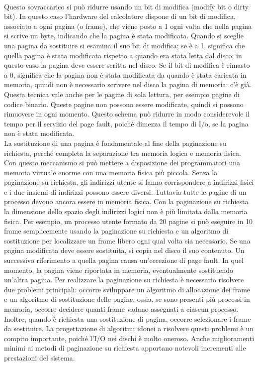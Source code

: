 \documentclass{article}
\begin{document}
				\\Questo sovraccarico si può ridurre usando un bit di modifica (modify bit o dirty bit). In questo caso l’hardware del calcolatore dispone di un bit di modifica, associato a ogni pagina (o frame), che viene posto a 1 ogni volta che nella pagina si scrive un byte, indicando che la pagina è stata modificata. Quando si sceglie una pagina da sostituire si esamina il suo bit di modifica; se è a 1, significa che quella pagina è stata modificata rispetto a quando era stata letta dal disco; in questo caso la pagina deve essere scritta nel disco. Se il bit di modifica è rimasto a 0, significa che la pagina non è stata modificata da quando è stata caricata in memoria, quindi non è necessario scrivere nel disco la pagina di memoria: c’è già. Questa tecnica vale anche per le pagine di sola lettura, per esempio pagine di codice binario. Queste pagine non possono essere modificate, quindi si possono rimuovere in ogni momento. Questo schema può ridurre in modo considerevole il tempo per il servizio del page fault, poiché dimezza il tempo di I/o, se la pagina non è stata modificata.
				\\La sostituzione di una pagina è fondamentale al fine della paginazione su richiesta, perché completa la separazione tra memoria logica e memoria fisica. Con questo meccanismo si può mettere a disposizione dei programmatori una memoria virtuale enorme con una memoria fisica più piccola. Senza la paginazione su richiesta, gli indirizzi utente si fanno corrispondere a indirizzi fisici e i due insiemi di indirizzi possono essere diversi. Tuttavia tutte le pagine di un processo devono ancora essere in memoria fisica. Con la paginazione su richiesta la dimensione dello spazio degli indirizzi logici non è più limitata dalla memoria fisica. Per esempio, un processo utente formato da 20 pagine si può eseguire in 10 frame semplicemente usando la paginazione su richiesta e un algoritmo di sostituzione per localizzare un frame libero ogni qual volta
				sia necessario. Se una pagina modificata deve essere sostituita, si copia nel disco il suo contenuto. Un successivo riferimento a quella pagina causa un’eccezione di page fault. In quel momento, la pagina viene riportata in memoria, eventualmente sostituendo un’altra pagina.
				Per realizzare la paginazione su richiesta è necessario risolvere due problemi principali: occorre sviluppare un algoritmo di allocazione dei frame e un algoritmo di sostituzione delle pagine. ossia, se sono presenti più processi in memoria, occorre decidere quanti frame vadano assegnati a ciascun processo. Inoltre, quando è richiesta una sostituzione di pagina, occorre selezionare i frame da sostituire. La progettazione di algoritmi idonei a risolvere questi problemi è un compito importante, poiché l’I/O nei dischi è molto oneroso. Anche miglioramenti minimi ai metodi di paginazione su richiesta apportano notevoli incrementi alle prestazioni del sistema.
\end{document}
